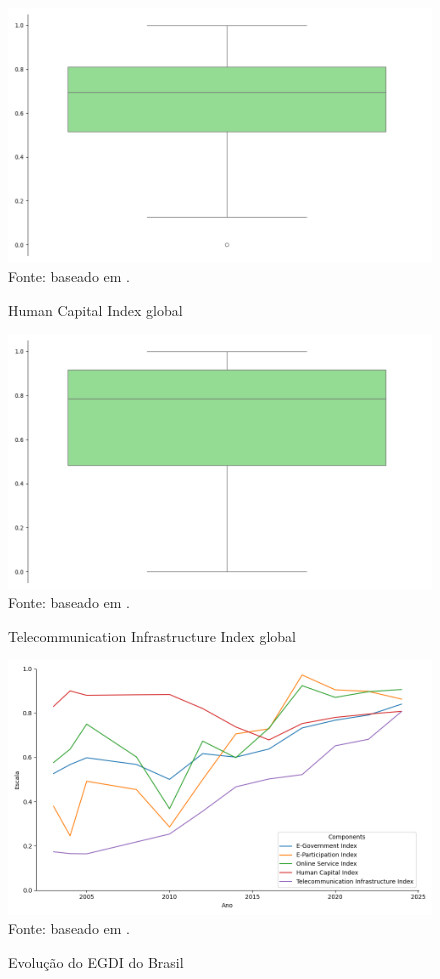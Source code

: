 \begin{figure}[H]
    \centering
    \caption{Human Capital Index global}
    \includegraphics[width=1\linewidth]{figuras/egdi/boxplot_hci_global.png}
    \label{fig:boxplot_hci_global}
    \footnotesize{Fonte: baseado em \cite{ONU_edgi_mapa}.}
\end{figure}

\begin{figure}[H]
    \centering
    \caption{Telecommunication Infrastructure Index global}
    \includegraphics[width=1\linewidth]{figuras/egdi/boxplot_tci_global.png}
    \label{fig:boxplot_tci_global}
    \footnotesize{Fonte: baseado em \cite{ONU_edgi_mapa}.}
\end{figure}

\begin{figure}[H]
    \centering
    \caption{Evolução do EGDI do Brasil}
    \includegraphics[width=1\linewidth]{figuras/egdi/lineplot_egdi_brasil.png}
    \label{fig:lineplot_egdi_brasil}
    \footnotesize{Fonte: baseado em \cite{ONU_edgi_mapa}.}
\end{figure}

